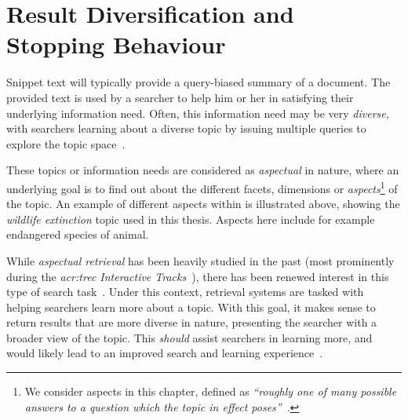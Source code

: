 
\chapter[Result Diversification and Stopping Behaviour]{Result Diversification and\\Stopping Behaviour}\label{chap:diversity}
Snippet text will typically provide a query-biased summary of a document. The provided text is used by a searcher to help him or her in satisfying their underlying information need. Often, this information need may be very \emph{diverse,} with searchers learning about a diverse topic by issuing multiple queries to explore the topic space~\citep{kelly2015search_tasks}.

\begin{figure}[h]
    \centering
    \vspace{4mm}
    \label{fig:aspectsintro}
    \vspace{-5mm}
\end{figure}

These topics or information needs are considered as \emph{aspectual} in nature, where an underlying goal is to find out about the different facets, dimensions or \emph{aspects}\footnote{We consider aspects in this chapter, defined as \emph{``roughly one of many possible answers to a question which the topic in effect poses''}~\citep{over1998trec}.} of the topic. An example of different aspects within is illustrated above, showing the \emph{wildlife extinction} topic used in this thesis. Aspects here include for example endangered species of animal.

While \emph{aspectual retrieval} has been heavily studied in the past (most prominently during the \emph{\gls{acr:trec} Interactive Tracks}~\citep{over2001trec}), there has been renewed interest in this type of search task~\citep{collins2017sal}. Under this context, retrieval systems are tasked with helping searchers learn more about a topic. With this goal, it makes sense to return results that are more diverse in nature, presenting the searcher with a broader view of the topic. This \emph{should} assist searchers in learning more, and would likely lead to an improved search and learning experience~\citep{syed2017sal}.

